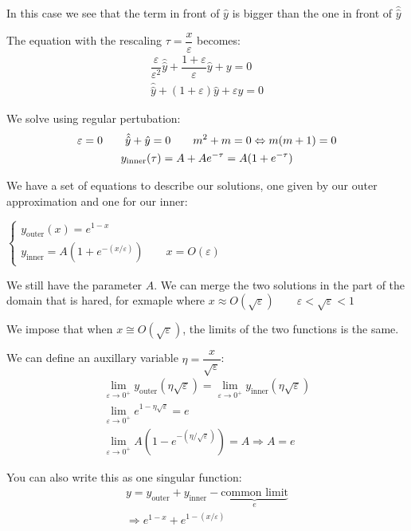 \noindent In this case we see that the term in front of $\hat{y}$ is bigger than the one in front of $\hat{\hat{y}}$ 
\par\bigskip
\noindent The equation with the rescaling $\tau = \dfrac{x}{\varepsilon}$ becomes:
\begin{equation*}
  \begin{gathered}
    \dfrac{\varepsilon}{\varepsilon^2}\hat{\hat{y}} + \dfrac{1+\varepsilon}{\varepsilon}\hat{y} + y = 0\\
    \hat{\hat{y}}+(1+\varepsilon)\hat{y}+\varepsilon y = 0
  \end{gathered}
\end{equation*}\par
\noindent We solve using regular pertubation:
\begin{equation*}
  \begin{gathered}
    \varepsilon = 0\qquad \hat{\hat{y}}+\hat{y} = 0\qquad m^2+m=0\Leftrightarrow m(m+1) = 0\\
    y_{\text{inner}}(\tau) = A+Ae^{-\tau} = A(1+e^{-\tau})
  \end{gathered}
\end{equation*}
\par\bigskip
\noindent We have a set of equations to describe our solutions, one given by our outer approximation and one for our inner:
\par\bigskip
$
\begin{cases*}
  y_{\text{outer}}(x) = e^{1-x}\\
  y_{\text{inner}} = A(1+e^{-(x/\varepsilon)})\qquad x= O(\varepsilon)
\end{cases*}$
\par\bigskip
\noindent We still have the parameter $A$. We can merge the two solutions in the part of the domain that is hared, for exmaple where $x\approx O(\sqrt{\varepsilon})\qquad \varepsilon<\sqrt{\varepsilon}<1$\par
\noindent We impose that when $x\cong O(\sqrt{\varepsilon})$, the limits of the two functions is the same.
\par\bigskip
\noindent We can define an auxillary variable $\eta = \dfrac{x}{\sqrt{\varepsilon}}$:
\begin{equation*}
  \begin{gathered}
    \lim_{\varepsilon\to0^+}y_{\text{outer}}(\eta\sqrt{\varepsilon}) = \lim_{\varepsilon\to0^+}y_{\text{inner}}(\eta\sqrt{\varepsilon})\\
    \lim_{\varepsilon\to0^+}e^{1-\eta\sqrt{\varepsilon}} = e\\
    \lim_{\varepsilon\to0^+}A\left(1-e^{-(\eta/\sqrt{\varepsilon})}\right) = A\Rightarrow A = e
  \end{gathered}
\end{equation*}
\par\bigskip
\noindent You can also write this as one singular function:
\begin{equation*}
  \begin{gathered}
    y = y_{\text{outer}} + y_{\text{inner}} - \underbrace{\text{common limit}}_{\text{$e$}}\\
    \Rightarrow e^{1-x}+e^{1-(x/\varepsilon)}
  \end{gathered}
\end{equation*}
